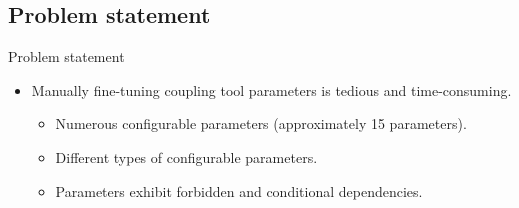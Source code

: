 \documentclass[10pt]{beamer}
\begin{document}
\subsection{Problem statement}
\begin{frame}[t]{Problem statement}
\begin{itemize}
\item<1-> Manually fine-tuning coupling tool parameters is tedious and time-consuming.
\newline
\begin{itemize}
\item Numerous configurable parameters (approximately 15 parameters).
\newline
\item Different types of configurable parameters.
\newline
\item Parameters exhibit forbidden and conditional dependencies.
\newline
\end{itemize}
\end{itemize}
\end{frame}
\end{document}
